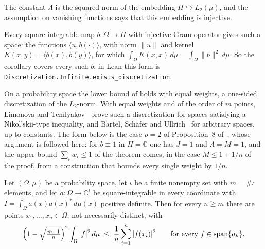 The constant $\Lambda$ is the squared norm of the embedding $H \hookrightarrow L_2(\mu)$, and
the assumption on vanishing functions says that this embedding is injective.

Every square-integrable map $b : \Omega \to H$ with injective Gram operator gives such a
space: the functions $\langle u, b(\cdot) \rangle$, with norm $\|u\|$ and kernel
$K(x, y) = \langle b(x), b(y) \rangle$, for which
$\int_\Omega K(x, x) \, d\mu = \int_\Omega \|b\|^2 \, d\mu$. So the corollary covers every
such $b$; in Lean this form is \texttt{Discretization.Infinite.exists\_discretization}.

On a probability space the lower bound of  holds with equal
weights, a one-sided discretization of the $L_2$-norm. With equal weights and of the order
of $m$ points, Limonova and Temlyakov~\cite[Theorem~1.1]{LT} prove such a discretization
for spaces satisfying a Nikol'skii-type inequality, and Bartel, Sch\"afer and
Ullrich~\cite{BSU} for arbitrary spaces, up to constants. The form below is the case
$p = 2$ of Proposition~8 of~\cite{CDKU}, whose argument is followed here: for
$b \equiv 1$ in $H = \mathbb{C}$ one has $J = 1$ and $\Lambda = M = 1$, and the upper
bound $\sum_i w_i \leq 1$ of the theorem comes, in the case $M \leq 1 + 1/n$ of the
proof, from a construction that bounds every single weight by $1/n$.

\begin{corollary}
\label{cor:one-sided-discretization}
\leanok
Let $(\Omega, \mu)$ be a probability space, let $\iota$ be a finite nonempty set with
$m = \#\iota$ elements, and let $a : \Omega \to \mathbb{C}^{\iota}$ be square-integrable in
every coordinate with $I = \int_\Omega a(x) a(x)^* \, d\mu(x)$ positive definite. Then for
every $n \geq m$ there are points $x_1, \dots, x_n \in \Omega$, not necessarily distinct,
with
\[
  \Bigl(1 - \sqrt{\tfrac{m-1}{n}}\Bigr)^2 \int_\Omega |f|^2 \, d\mu
    \; \leq \; \frac{1}{n} \sum_{i=1}^n |f(x_i)|^2
  \qquad \text{for every } f \in \operatorname{span}\{a_k\}.
\]
\end{corollary}

